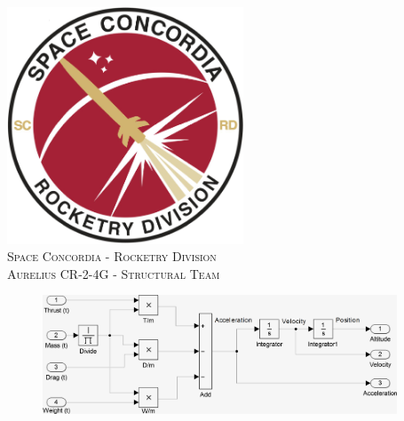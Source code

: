 %
%
\begin{titlepage}

\newcommand{\HRule}{\rule{\linewidth}{0.5mm}} %

\center %
 

\includegraphics[width=200pt,height=200pt]{../images/rocketry_logo_large.png}\\[1cm] %
\textsc{\Large Space Concordia - Rocketry Division}\\[0.5cm] %
\textsc{\large Aurelius CR-2-4G - Structural Team}\\[0.5cm] %


\begin{figure}[ht]
    \centering
    \includegraphics[height=100pt]{../images/vertical_model_simplified.png}\\
\end{figure}


\end{titlepage}
